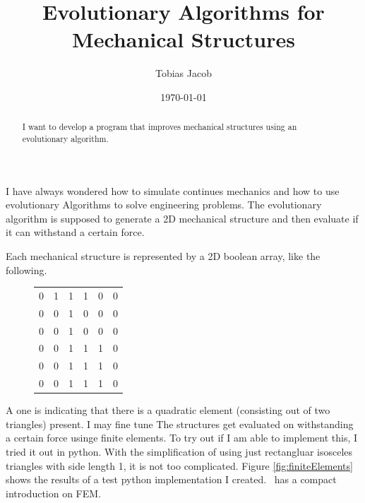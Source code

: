 \documentclass[12pt]{article}
\title{\vspace{-3em}Evolutionary Algorithms for Mechanical Structures}
\author{Tobias Jacob}
\date{\today}
\begin{document}
\maketitle

\begin{abstract}
\centering
I want to develop a program that improves mechanical structures using an evolutionary algorithm.
\end{abstract}

I have always wondered how to simulate continues mechanics and how to use evolutionary Algorithms to solve engineering problems. The evolutionary algorithm is supposed to generate a 2D mechanical structure and then evaluate if it can withstand a certain force.

\begin{figure}[h]
    \centering
\end{figure}

Each mechanical structure is represented by a 2D boolean array, like the following.

\begin{figure}[h]
    \centering
    \begin{tabular}{cccccc}
        0 & 1 & 1 & 1 & 0 & 0 \\
        0 & 0 & 1 & 0 & 0 & 0 \\
        0 & 0 & 1 & 0 & 0 & 0 \\
        0 & 0 & 1 & 1 & 1 & 0 \\
        0 & 0 & 1 & 1 & 1 & 0 \\
        0 & 0 & 1 & 1 & 1 & 0
    \end{tabular}
\end{figure}

A one is indicating that there is a quadratic element (consisting out of two triangles) present. I may fine tune  The structures get evaluated on withstanding a certain force usinge finite elements. To try out if I am able to implement this, I tried it out in python. With the simplification of using just rectangluar isosceles triangles with side length 1, it is not too complicated. Figure \ref{fig:finiteElements} shows the results of a test python implementation I created. \cite{Nikishkov2004}~has a compact introduction on FEM.
\end{document}
